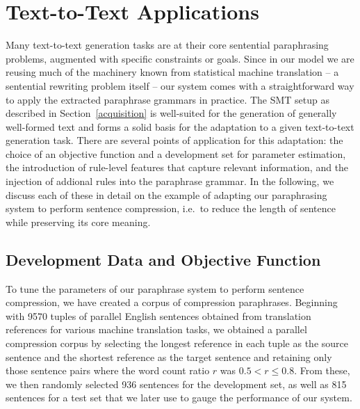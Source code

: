 \documentclass[11pt]{article}
\begin{document}


\section{Text-to-Text Applications} \label{adaptation}

Many text-to-text generation tasks are at their core sentential
paraphrasing problems, augmented with specific constraints or
goals. Since in our model we are reusing much of the machinery known
from statistical machine translation -- a sentential rewriting problem
itself -- our system comes with a straightforward way to apply the
extracted paraphrase grammars in practice. The SMT setup as described
in Section~\ref{acquisition} is well-suited for the generation of
generally well-formed text and forms a solid basis for the adaptation
to a given text-to-text generation task. There are several points of
application for this adaptation: the choice of an objective function
and a development set for parameter estimation, the introduction of
rule-level features that capture relevant information, and the
injection of addional rules into the paraphrase grammar. In the
following, we discuss each of these in detail on the example of
adapting our paraphrasing system to perform sentence compression,
i.e.\ to reduce the length of sentence while preserving its core
meaning.

\subsection{Development Data and Objective Function}
To tune the parameters of our paraphrase system to perform sentence
compression, we have created a corpus of compression
paraphrases. Beginning with 9570 tuples of parallel English sentences
obtained from translation references for various machine translation
tasks, we obtained a parallel compression corpus by selecting the
longest reference in each tuple as the source sentence and the
shortest reference as the target sentence and retaining only those
sentence pairs where the word count ratio $r$ was $0.5 < r \leq
0.8$. From these, we then randomly selected 936 sentences for the
development set, as well as 815 sentences for a test set that we later
use to gauge the performance of our system.
\end{document}
